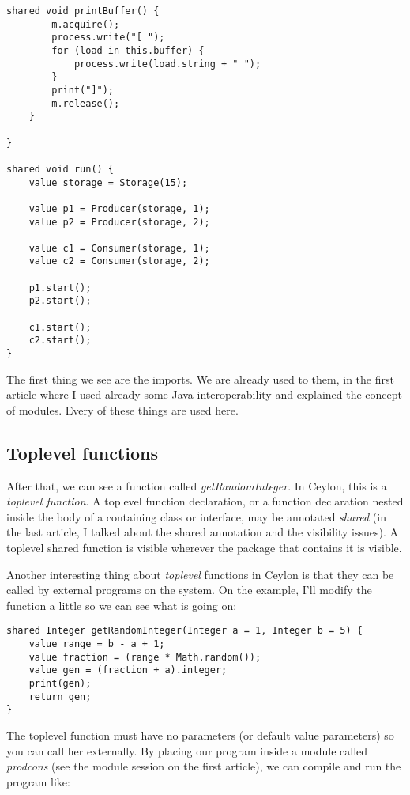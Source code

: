 \documentclass{abnt}
\begin{document}
\begin{lstlisting}[label=cpc,caption=Ceylon Producer-Consumer example]
	shared void printBuffer() {
		m.acquire();
		process.write("[ ");
		for (load in this.buffer) {
			process.write(load.string + " ");
		}
		print("]");
		m.release();
	}

}

shared void run() {
	value storage = Storage(15);

	value p1 = Producer(storage, 1);
	value p2 = Producer(storage, 2);

	value c1 = Consumer(storage, 1);
	value c2 = Consumer(storage, 2);

	p1.start();
	p2.start();

	c1.start();
	c2.start();
}
\end{lstlisting}

The first thing we see are the imports. We are already used to them, in the
first article where I used already some Java interoperability and explained the
concept of modules. Every of these things are used here.

\subsection{Toplevel functions}

After that, we can see a function called \textit{getRandomInteger}. In Ceylon, this is a
\textit{toplevel function}. A toplevel function declaration, or a function declaration
nested inside the body of a containing class or interface, may be annotated
\textit{shared} (in the last article, I talked about the shared annotation and the
visibility issues). A toplevel shared function is visible wherever the package
that contains it is visible.

Another interesting thing about \textit{toplevel} functions in Ceylon is that they can
be called by external programs on the system. On the example, I'll modify the
function a little so we can see what is going on:

\begin{lstlisting}[label=cri,caption=Ceylon random integer function]
shared Integer getRandomInteger(Integer a = 1, Integer b = 5) {
	value range = b - a + 1;
	value fraction = (range * Math.random());
	value gen = (fraction + a).integer;
	print(gen);
	return gen;
}
\end{lstlisting}


The toplevel function must have no parameters (or default value parameters) so
you can call her externally. By placing our program inside a module called
\textit{prodcons} (see the module session on the first article), we can compile
and run the program like:
\end{document}

